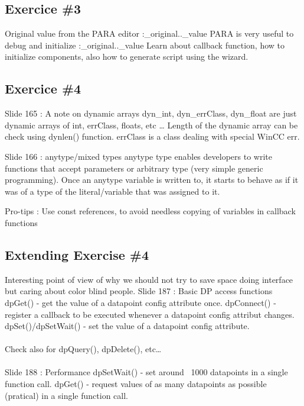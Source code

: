 \documentclass[a4paper, 10pt]{article}
\begin{document}
\subsection{Exercice \#3}
Original value from the PARA editor :\_original..\_value
PARA is very useful to debug and initialize :\_original..\_value
Learn about callback function, how to initialize components, also how to generate script using the wizard.

\subsection{Exercice \#4}

Slide 165 : A note on dynamic arrays
dyn\_int, dyn\_errClass, dyn\_float are just dynamic arrays of int, errClass, floats, etc \dots 
Length of the dynamic array can be check using dynlen() function.
errClass is a class dealing with special WinCC err.

Slide 166 : anytype/mixed types
anytype type enables developers to write functions that accept parameters or arbitrary type (very simple generic programming). Once an anytype variable is written to, it starts to behave as if it was of a type of the literal/variable that was assigned to it.

Pro-tips : Use const references, to avoid needless copying of variables in callback functions

\subsection{Extending Exercise \#4}
Interesting point of view of why we should not try to save space doing interface but caring about color blind people. Slide 187 : Basic DP access functions
dpGet() - get the value of a datapoint config attribute once.
dpConnect() - register a callback to be executed whenever a datapoint config attribut changes.
dpSet()/dpSetWait() - set the value of a datapoint config attribute.

\paragraph{}
Check also for dpQuery(), dpDelete(), etc\dots

\paragraph{}
Slide 188 : Performance
dpSetWait() - set around ~1000 datapoints in a single function call.
dpGet() - request values of as many datapoints as possible (pratical) in a single function call.
\end{document}
